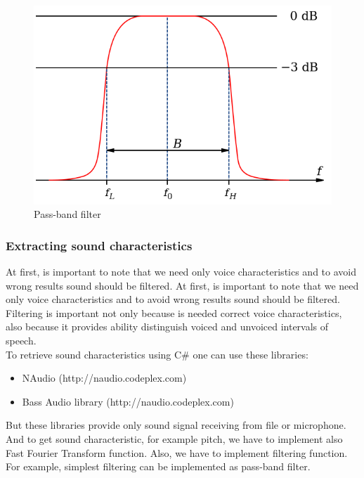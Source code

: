 \documentclass[12pt, letterpaper]{article}
\begin{document}
\begin{figure}
	\centering
		\includegraphics[scale=0.7]{images/pass-band-filter.png}
	\caption{Pass-band filter}
	\label{fig:pass-band-filter}
\end{figure}

\subsubsection{Extracting sound characteristics}

At first, is important to note that we need only voice characteristics and to avoid wrong results sound should be filtered. At first, is important to note that we need only voice characteristics and to avoid wrong results sound should be filtered. Filtering is important not only because is needed correct voice characteristics, also because it provides ability distinguish voiced and unvoiced intervals of speech. 
\\

To retrieve sound characteristics using C\# one can use these libraries:
\begin{itemize}
	\item NAudio (http://naudio.codeplex.com)
	\item Bass Audio library (http://naudio.codeplex.com)
\end{itemize}

But these libraries provide only sound signal receiving from file or microphone. And to get sound characteristic, for example pitch, we have to implement also Fast Fourier Transform function. Also, we have to implement filtering function. For example, simplest filtering can be implemented as pass-band filter. 
\end{document}
